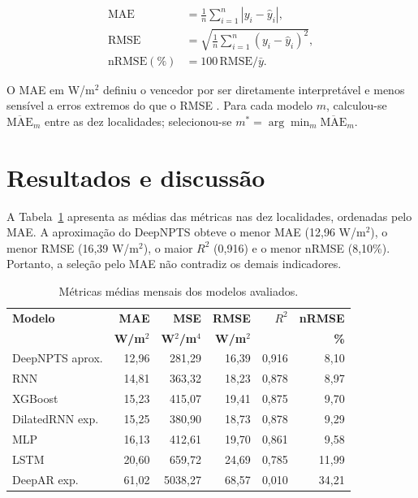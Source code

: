 \documentclass[12pt,a4paper]{article}
\begin{document}
\begin{equation}
\begin{aligned}
 \mathrm{MAE}&=\frac{1}{n}\sum_{i=1}^{n}|y_i-\widehat y_i|,\\
 \mathrm{RMSE}&=\sqrt{\frac{1}{n}\sum_{i=1}^{n}(y_i-\widehat y_i)^2},\\
 \mathrm{nRMSE}(\%)&=100\,\mathrm{RMSE}/\bar y.
\end{aligned}
\label{eq:metricas}
\end{equation}

O MAE em W/m$^2$ definiu o vencedor por ser diretamente interpretável e menos sensível a erros extremos do que o RMSE \citep{hyndman2006}. Para cada modelo $m$, calculou-se $\overline{\mathrm{MAE}}_m$ entre as dez localidades; selecionou-se $m^*=\arg\min_m\overline{\mathrm{MAE}}_m$.

\section{Resultados e discussão}
\label{sec:resultados}

A Tabela~\ref{tab:metricas} apresenta as médias das métricas nas dez localidades, ordenadas pelo MAE. A aproximação do DeepNPTS obteve o menor MAE (12,96 W/m$^2$), o menor RMSE (16,39 W/m$^2$), o maior $R^2$ (0,916) e o menor nRMSE (8,10\%). Portanto, a seleção pelo MAE não contradiz os demais indicadores.

\begin{table}[htbp]
\centering
\caption{Métricas médias mensais dos modelos avaliados.}
\label{tab:metricas}
\renewcommand{\arraystretch}{1.04}
\setlength{\tabcolsep}{6pt}
\begin{tabular}{lrrrrr}
\toprule
\textbf{Modelo} & \textbf{MAE} & \textbf{MSE} & \textbf{RMSE} & \textbf{$R^2$} & \textbf{nRMSE} \\
 & \textbf{W/m$^2$} & \textbf{W$^2$/m$^4$} & \textbf{W/m$^2$} & & \textbf{\%} \\
\midrule
DeepNPTS aprox. & 12,96 & 281,29 & 16,39 & 0,916 & 8,10 \\
RNN & 14,81 & 363,32 & 18,23 & 0,878 & 8,97 \\
XGBoost & 15,23 & 415,07 & 19,41 & 0,875 & 9,70 \\
DilatedRNN exp. & 15,25 & 380,90 & 18,73 & 0,878 & 9,29 \\
MLP & 16,13 & 412,61 & 19,70 & 0,861 & 9,58 \\
LSTM & 20,60 & 659,72 & 24,69 & 0,785 & 11,99 \\
DeepAR exp. & 61,02 & 5038,27 & 68,57 & 0,010 & 34,21 \\
\bottomrule
\end{tabular}
\end{table}
\end{document}
